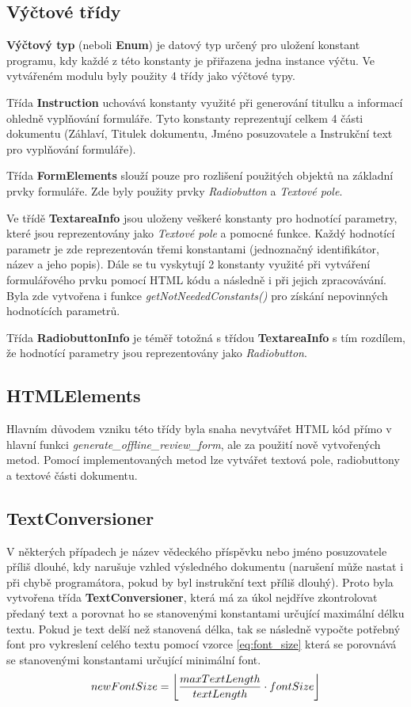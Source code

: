 \subsection{Výčtové třídy}
\textbf{Výčtový typ} (neboli \textbf{Enum}) je datový typ určený pro uložení konstant programu, kdy každé z této konstanty je přiřazena jedna instance výčtu. Ve vytvářeném modulu byly použity 4 třídy jako výčtové typy. 
\par
Třída \textbf{Instruction} uchovává konstanty využité při generování titulku a informací ohledně vyplňování formuláře. Tyto konstanty reprezentují celkem 4 části dokumentu (Záhlaví, Titulek dokumentu, Jméno posuzovatele a Instrukční text pro vyplňování formuláře).
\par
Třída \textbf{FormElements} slouží pouze pro rozlišení použitých objektů na základní prvky formuláře. Zde byly použity prvky \textit{Radiobutton} a \textit{Textové pole}.
\par
Ve třídě \textbf{TextareaInfo} jsou uloženy veškeré konstanty pro hodnotící parametry, které jsou reprezentovány jako \textit{Textové pole} a pomocné funkce. Každý hodnotící parametr je zde reprezentován třemi konstantami (jednoznačný identifikátor, název a jeho popis). Dále se tu vyskytují 2 konstanty využité při vytváření formulářového prvku pomocí HTML kódu a následně i při jejich zpracovávání. Byla zde vytvořena i funkce \textit{getNotNeededConstants()} pro získání nepovinných hodnotících parametrů.
\par
Třída \textbf{RadiobuttonInfo} je téměř totožná s třídou \textbf{TextareaInfo} s tím rozdílem, že hodnotící parametry jsou reprezentovány jako \textit{Radiobutton}.
\subsection{HTMLElements}
Hlavním důvodem vzniku této třídy byla snaha nevytvářet HTML kód přímo v hlavní funkci \textit{generate\_offline\_review\_form}, ale za použití nově vytvořených metod. Pomocí implementovaných metod lze vytvářet textová pole, radiobuttony a textové části dokumentu.
\subsection{TextConversioner}
V některých případech je název vědeckého příspěvku nebo jméno posuzovatele příliš dlouhé, kdy narušuje vzhled výsledného dokumentu (narušení může nastat i při chybě programátora, pokud by byl instrukční text příliš dlouhý). Proto byla vytvořena třída \textbf{TextConversioner}, která má za úkol nejdříve zkontrolovat předaný text a porovnat ho se stanovenými konstantami určující maximální délku textu. Pokud je text delší než stanovená délka, tak se následně vypočte potřebný font pro vykreslení celého textu pomocí vzorce \eqref{eq:font_size} která se porovnává se stanovenými konstantami určující minimální font. 
\begin{equation}
newFontSize = \floor*{\frac{maxTextLength}{textLength} \cdot fontSize} \label{eq:font_size}
\end{equation}

